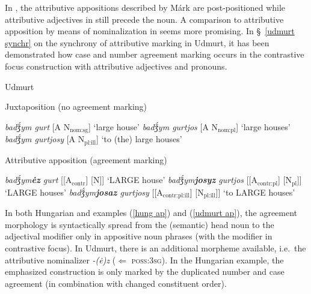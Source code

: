 {In , the attributive appositions described by Márk are post-positioned while attributive adjectives in  still precede the noun. A comparison to attributive apposition by means of nominalization in  seems more promising. In \S~\ref{udmurt synchr} on the synchrony of attributive marking in Udmurt, it has been demonstrated how case and number agreement marking occurs in the contrastive focus construction with attributive adjectives and pronouns.
\begin{exe} \label{udmurt ap}
\ex \rm{Udmurt \citep{winkler2001}}
\begin{xlist}
\ex 	\rm{Juxtaposition (no agreement marking)}
\begin{xlist}
\ex	\textit{badǯ́ym gurt} 				\rm{[A N$_{\text{nom:sg}}$] ‘large house’}
\ex	\textit{badǯ́ym gurtjos} 			\rm{[A N$_{\text{nom:pl}}$] ‘large houses’}
\ex	\textit{badǯ́ym gurtjosy} 			\rm{[A N$_{\text{pl:ill}}$] ‘to (the) large houses’}
\end{xlist}
\ex	\rm{Attributive apposition (agreement marking)}
\begin{xlist}
\ex	\textit{badǯ́ym\textbf{ėz} gurt} 		\rm{[[A$_{\text{contr}}$] [N]] ‘LARGE house’}
\ex	\textit{badǯ́ym\textbf{josyz} gurtjos} 	\rm{[[A$_{\text{contr:pl}}$] [N$_{\text{pl}}$]] ‘LARGE houses’}
\ex	\textit{badǯ́ym\textbf{josaz} gurtjosy} 	\rm{[[A$_{\text{contr:pl:ill}}$] [N$_{\text{pl:ill}}$]] ‘to LARGE houses’}
\end{xlist}
\end{xlist}
\end{exe}
In both Hungarian and  examples (\ref{hung ap}) and (\ref{udmurt ap}), the agreement morphology is syntactically spread from the (semantic) head noun to the adjectival modifier only in appositive noun phrases (with the modifier in contrastive focus). In Udmurt, there is an additional morpheme available, i.e.~the attributive nominalizer \textit{-(ė)z} ($\Leftarrow$ \textsc{poss:3sg}). In the Hungarian example, the emphasized construction is only marked by the duplicated number and case agreement (in combination with changed constituent order).

}
